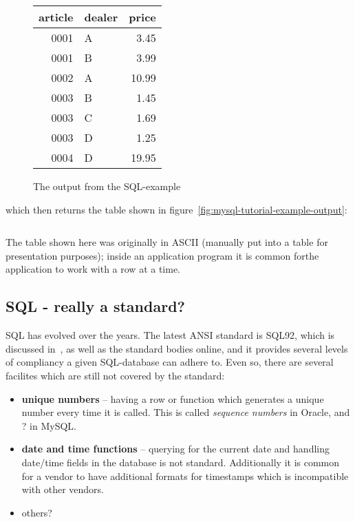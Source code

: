 \begin{figure}[htbp]
  \begin{center}
    \begin{tabular}{|r|l|r|}
\hline\hline
 article & dealer & price\\
\hline
    0001 & A      &  3.45\\
    0001 & B      &  3.99\\
    0002 & A      & 10.99\\
    0003 & B      &  1.45\\
    0003 & C      &  1.69\\
    0003 & D      &  1.25\\
    0004 & D      & 19.95\\
\hline
    \end{tabular}

    \caption{The output from the SQL-example}
    \label{fig:mysql-tutorial-example-output}
  \end{center}
\end{figure}
which then returns the table shown in figure~\vref{fig:mysql-tutorial-example-output}:

\begin{verbatim}
\end{verbatim}

The table shown here was originally in ASCII (manually put into a
table for presentation purposes); inside an application program it is
common forthe application to work with a row at a time.


\subsection{SQL - really a standard?}
\label{sec:how-standardized-is-sql}

SQL has evolved over the years.  The latest ANSI standard is SQL92,
which is discussed in~\cite{understanding-the-new-sql}, \textsf{as
  well as the standard bodies online}, and it provides several levels
of compliancy a given SQL-database can adhere to.  Even so, there are
several facilites which are still not covered by the standard:

\begin{itemize}
\item \textbf{unique numbers} -- having a row or function which
  generates a unique number every time it is called.  This is called
  \textit{sequence numbers} in Oracle, and \textsf{?} in MySQL.
\item \textbf{date and time functions} -- querying for the current
  date and handling date/time fields in the database is not standard.
  Additionally it is common for a vendor to have additional formats
  for timestamps which is incompatible with other vendors.
\item \textsf{others?}
\end{itemize}

